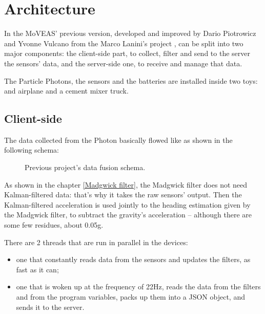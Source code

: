 \chapter{Architecture}
In the MoVEAS' previous version, developed and improved by Dario Piotrowicz \cite{Pio19} and Yvonne Vulcano \cite{Vul19} from the Marco Lanini's project \cite{Lan17}, can be split into two major components: the client-side part, to collect, filter and send to the server the sensors' data, and the server-side one, to receive and manage that data.
\bigbreak

The Particle Photons, the sensors and the batteries are installed inside two toys: and airplane and a cement mixer truck.

\section{Client-side}
The data collected from the Photon basically flowed like as shown in the following schema:

\begin{center}
	\begin{figure}[ht!]
		\caption{Previous project's data fusion schema.} \label{old data fusion schema}
	\end{figure}
\end{center}
\bigbreak

As shown in the chapter \ref{Madgwick filter}, the Madgwick filter does not need Kalman-filtered data: that's why it takes the raw sensors' output. Then the Kalman-filtered acceleration is used jointly to the heading estimation given by the Madgwick filter, to subtract the gravity's acceleration – although there are some few residues, about 0.05g.
\bigbreak

There are 2 threads that are run in parallel in the devices:
\begin{itemize}
	\item one that constantly reads data from the sensors and updates the filters, as fast as it can;
	\item one that is woken up at the frequency of 22Hz, reads the data from the filters and from the program variables, packs up them into a JSON object, and sends it to the server.
\end{itemize}

